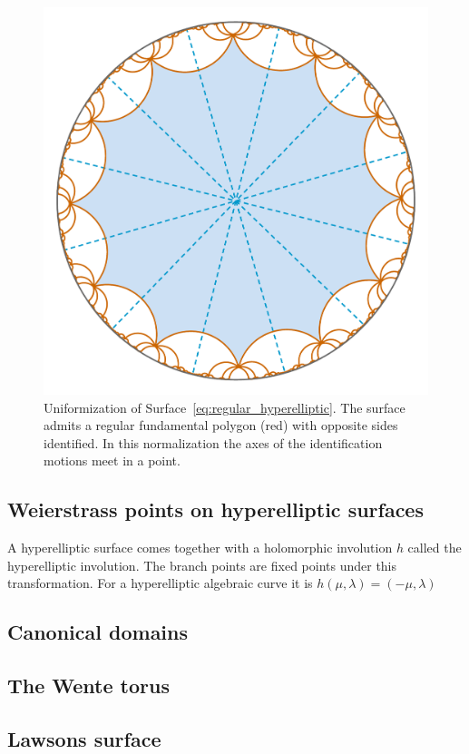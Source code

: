 \documentclass[Thesis.tex]{subfiles}
\begin{document}
\begin{figure}
\centering
\includegraphics[width=\linewidth]{data/hyperelliptic_g3/cover}
\caption{Uniformization of Surface~\ref{eq:regular_hyperelliptic}. The surface admits
a regular fundamental polygon (red) with opposite sides identified. In this normalization
the axes of the identification motions meet in a point.}
\label{fig:regular_cover}
\end{figure}


\subsection{Weierstrass points on hyperelliptic surfaces}
A hyperelliptic surface comes together with a holomorphic involution $h$ called the hyperelliptic involution. The branch points are fixed points under this transformation. For a hyperelliptic algebraic curve it is $h(\mu, \lambda)=(-\mu, \lambda)$

\subsection{Canonical domains}
\subsection{The Wente torus}
\subsection{Lawsons surface}
\end{document}
